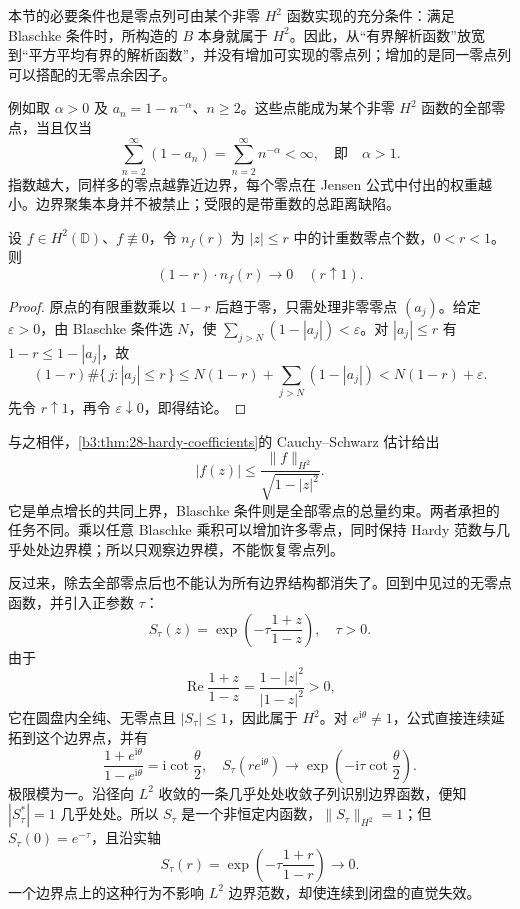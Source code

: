 本节的必要条件也是零点列可由某个非零 \(H^2\) 函数实现的充分条件：满足 Blaschke 条件时，所构造的 \(B\) 本身就属于 \(H^2\)。因此，从“有界解析函数”放宽到“平方平均有界的解析函数”，并没有增加可实现的零点列；增加的是同一零点列可以搭配的无零点余因子。

\ProseParagraphBreak

例如取 \(\alpha>0\) 及 \(a_n=1-n^{-\alpha}\)、\(n\ge2\)。这些点能成为某个非零 \(H^2\) 函数的全部零点，当且仅当
\[
 \sum_{n=2}^{\infty}(1-a_n)=\sum_{n=2}^{\infty}n^{-\alpha}<\infty,
 \quad\text{即}\quad\alpha>1.
\]
指数越大，同样多的零点越靠近边界，每个零点在 Jensen 公式中付出的权重越小。边界聚集本身并不被禁止；受限的是带重数的总距离缺陷。

\begin{corollary}[内部零点数的边界尺度]\label{b3:cor:28-zero-count-scale}
设 \(f\in H^2(\mathbb D)\)、\(f\not\equiv0\)，令 \(n_f(r)\) 为 \(|z|\le r\) 中的计重数零点个数，\(0<r<1\)。则
\[
 (1-r)\cdot n_f(r)\longrightarrow0\quad(r\uparrow1).
\]
\end{corollary}
\begin{proof}
原点的有限重数乘以 \(1-r\) 后趋于零，只需处理非零零点 \((a_j)\)。给定 \(\varepsilon>0\)，由 Blaschke 条件选 \(N\)，使 \(\sum_{j>N}(1-|a_j|)<\varepsilon\)。对 \(|a_j|\le r\) 有 \(1-r\le1-|a_j|\)，故
\[
 (1-r)\#\{\,j:|a_j|\le r\,\}
 \le N(1-r)+\sum_{j>N}(1-|a_j|)<N(1-r)+\varepsilon.
\]
先令 \(r\uparrow1\)，再令 \(\varepsilon\downarrow0\)，即得结论。
\end{proof}

与之相伴，\cref{b3:thm:28-hardy-coefficients}的 Cauchy--Schwarz 估计给出
\[
 |f(z)|\le\frac{\|f\|_{H^2}}{\sqrt{1-|z|^2}}.
\]
它是单点增长的共同上界，Blaschke 条件则是全部零点的总量约束。两者承担的任务不同。乘以任意 Blaschke 乘积可以增加许多零点，同时保持 Hardy 范数与几乎处处边界模；所以只观察边界模，不能恢复零点列。

\ProseParagraphBreak

反过来，除去全部零点后也不能认为所有边界结构都消失了。回到中见过的无零点函数，并引入正参数 \(\tau\)：
\begin{equation}\label{b3:eq:28-singular-inner-example}
 S_\tau(z)=\exp\left(-\tau\frac{1+z}{1-z}\right),
 \quad\tau>0.
\end{equation}
由于
\[
 \operatorname{Re}\frac{1+z}{1-z}
 =\frac{1-|z|^2}{|1-z|^2}>0,
\]
它在圆盘内全纯、无零点且 \(|S_\tau|\le1\)，因此属于 \(H^2\)。对 \(e^{\mathrm i\theta}\ne1\)，公式直接连续延拓到这个边界点，并有
\[
 \frac{1+e^{\mathrm i\theta}}{1-e^{\mathrm i\theta}}
 =\mathrm i\cot\frac\theta2,
 \quad
 S_\tau(re^{\mathrm i\theta})\longrightarrow
       \exp\left(-\mathrm i\tau\cot\frac\theta2\right).
\]
极限模为一。沿径向 \(L^2\) 收敛的一条几乎处处收敛子列识别边界函数，便知 \(|S_\tau^*|=1\) 几乎处处。所以 \(S_\tau\) 是一个非恒定内函数，\(\|S_\tau\|_{H^2}=1\)；但 \(S_\tau(0)=e^{-\tau}\)，且沿实轴
\[
 S_\tau(r)=\exp\left(-\tau\frac{1+r}{1-r}\right)\longrightarrow0.
\]
一个边界点上的这种行为不影响 \(L^2\) 边界范数，却使连续到闭盘的直觉失效。

